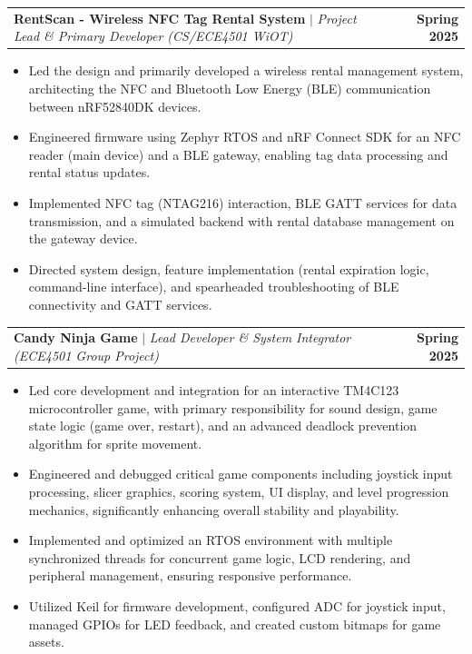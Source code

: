 \documentclass[letterpaper,11pt]{article}
\makeatletter
\newcommand{\resumeItem}[1]{
  \item\small{
    {#1 \vspace{-2pt}}
  }
}
\newcommand{\resumeProjectHeading}[2]{
    \item
    \begin{tabular*}{0.99\textwidth}{l@{\extracolsep{\fill}}r}
      \small#1 & \textbf{\small #2}\\
    \end{tabular*}\vspace{-5pt}
}
\newcommand{\resumeItemListStart}{\begin{itemize}}
\newcommand{\resumeItemListEnd}{\end{itemize}\vspace{-3pt}}
\makeatother
\begin{document}
        \resumeProjectHeading
            {\textbf{RentScan - Wireless NFC Tag Rental System} $|$ \emph{Project Lead \& Primary Developer (CS/ECE4501 WiOT)}}{Spring 2025}
            \resumeItemListStart
                \resumeItem{Led the design and primarily developed a wireless rental management system, architecting the NFC and Bluetooth Low Energy (BLE) communication between nRF52840DK devices.}
                \resumeItem{Engineered firmware using Zephyr RTOS and nRF Connect SDK for an NFC reader (main device) and a BLE gateway, enabling tag data processing and rental status updates.}
                \resumeItem{Implemented NFC tag (NTAG216) interaction, BLE GATT services for data transmission, and a simulated backend with rental database management on the gateway device.}
                \resumeItem{Directed system design, feature implementation (rental expiration logic, command-line interface), and spearheaded troubleshooting of BLE connectivity and GATT services.}
            \resumeItemListEnd
            \vspace{-12pt}

        \resumeProjectHeading
            {\textbf{Candy Ninja Game} $|$ \emph{Lead Developer \& System Integrator (ECE4501 Group Project)}}{Spring 2025}
            \resumeItemListStart
                \resumeItem{Led core development and integration for an interactive TM4C123 microcontroller game, with primary responsibility for sound design, game state logic (game over, restart), and an advanced deadlock prevention algorithm for sprite movement.}
                \resumeItem{Engineered and debugged critical game components including joystick input processing, slicer graphics, scoring system, UI display, and level progression mechanics, significantly enhancing overall stability and playability.}
                \resumeItem{Implemented and optimized an RTOS environment with multiple synchronized threads for concurrent game logic, LCD rendering, and peripheral management, ensuring responsive performance.}
                \resumeItem{Utilized Keil for firmware development, configured ADC for joystick input, managed GPIOs for LED feedback, and created custom bitmaps for game assets.}
            \resumeItemListEnd
            \vspace{-12pt}
\end{document}
